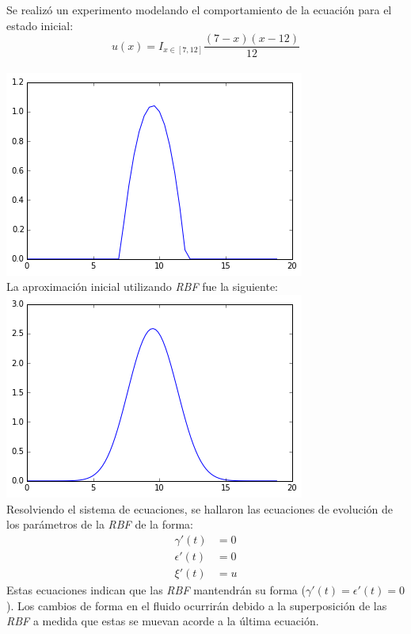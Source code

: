 \documentclass[spanish, fleqn]{article}
\begin{document}
    Se realizó un experimento modelando el comportamiento de la ecuación para el estado inicial:
    \begin{equation*}
      u(x) = I_{x \in [7,12]}\frac{(7-x)(x-12)}{12}
    \end{equation*} \\
    \includegraphics[scale=0.6]{initialu.png} \\
    La aproximación inicial utilizando \textit{RBF} fue la siguiente: \\
    \includegraphics[scale=0.6]{rbfapp.png} \\
    Resolviendo el sistema de ecuaciones, se hallaron las ecuaciones de evolución de los parámetros de la \textit{RBF} de la 
    forma:
    \begin{align*}
      \gamma'(t) &= 0 \\
      \epsilon'(t) &= 0 \\
      \xi'(t) &= u
    \end{align*}
    Estas ecuaciones indican que las \textit{RBF} mantendrán su forma ($\gamma'(t) = \epsilon'(t) = 0$). Los cambios de forma
    en el fluido ocurrirán debido a la superposición de las \textit{RBF} a medida que estas se muevan acorde a la última 
    ecuación.
    
\end{document}

